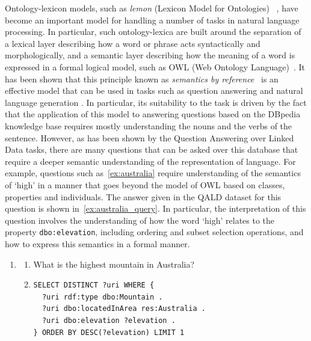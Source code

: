 \documentclass[11pt]{article}
\begin{document}
Ontology-lexicon models, such as \emph{lemon} (Lexicon Model for Ontologies)~
\cite{mccrae2012interchanging}, have become an important model for handling a 
number of tasks in natural language processing. In particular, such 
ontology-lexica are built around the separation of a lexical layer describing 
how a word or phrase acts syntactically and morphologically, and a semantic layer 
describing how the meaning of a word is expressed in a formal logical model, 
such as OWL (Web Ontology Language)~\cite{mcguinness2004owl}. It has been 
shown that this principle known as \emph{semantics by reference}~
\cite{buitelaar2010ontology} is an effective model that can be used in tasks 
such as question answering \cite{unger2011pythia} and natural language 
generation \cite{cimiano2013exploiting}. In particular, its suitability to the 
task is driven by the fact that the application of this model to answering questions 
based on the DBpedia \cite{auer2007dbpedia} knowledge base requires mostly 
understanding the nouns and the verbs of the sentence. However, as has been 
shown by the Question Answering over Linked Data \cite[QALD]{lopez2013evaluating}
tasks, there are many questions that can be asked over this database that require 
a deeper semantic understanding of the representation of language. For example, 
questions such as~\ref{ex:australia} require understanding of the semantics of `high' in a manner that goes beyond 
the model of OWL based on classes, properties and individuals. The answer given 
in the QALD dataset for this question is shown in~\ref{ex:australia_query}. 
In particular, the interpretation of this question involves the understanding of 
how the word `high' relates to the property {\tt dbo:elevation}, including ordering 
and subset selection operations, and how to express this semantics in a formal manner.

\begin{enumerate}
\item \begin{enumerate} 
\item What is the highest mountain in Australia? \label{ex:australia}
\item \begin{verbatim}
SELECT DISTINCT ?uri WHERE { 
  ?uri rdf:type dbo:Mountain . 
  ?uri dbo:locatedInArea res:Australia . 
  ?uri dbo:elevation ?elevation . 
} ORDER BY DESC(?elevation) LIMIT 1
\end{verbatim} 
\label{ex:australia_query}
\end{enumerate}
\end{enumerate}
\end{document}
